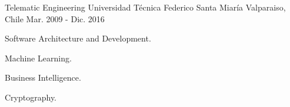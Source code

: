 \begin{cventries}
  \cventry
    {Telematic Engineering}
    {Universidad Técnica Federico Santa Miaría}
    {Valparaiso, Chile}
    {Mar. 2009 - Dic. 2016}
    {
      \begin{cvitems}
        \item {Software Architecture and Development.}
        \item {Machine Learning.}
        \item {Business Intelligence.}
        \item {Cryptography.}
      \end{cvitems}
    }
\end{cventries}